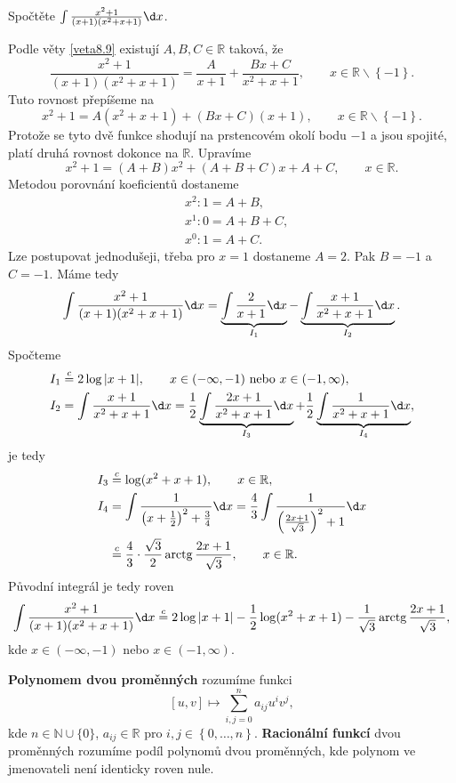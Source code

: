 \begin{priklad}
	Spočtěte $\int\frac{x^2+1}{(x+1)(x^2+x+1)}\d x$.
	\par Podle věty \ref{veta8.9} existují $A,B,C \in \mathbb R $ taková, že
	$$
	    \frac{x^2+1}{(x+1)(x^2+x+1)} = \frac{A}{x+1}+ \frac{Bx+C}{x^2+x+1}, \qquad x \in \mathbb R \smallsetminus \left \{ -1 \right \}.
	$$
	Tuto rovnost přepíšeme na
	$$
	    x^2+1 = A(x^2+x+1) + (Bx+C)(x+1), \qquad x \in \mathbb R \smallsetminus \left \{ -1 \right \}.
	$$
	Protože se tyto dvě funkce shodují na prstencovém okolí bodu $-1$ a jsou spojité,
	platí druhá rovnost dokonce na $\mathbb R $. Upravíme
	$$
	    x^2+1 = (A+B)x^2+(A+B+C)x+A+C, \qquad x \in \mathbb R.
	$$
	Metodou porovnání koeficientů dostaneme
	\begin{align*}
		&x^2: 1 = A+B,\\
		&x^1: 0=A+B+C, \\
		&x^0: 1 = A+C.
	\end{align*}
	Lze postupovat jednodušeji, třeba pro $x=1$ dostaneme $A=2$. Pak $B=-1$ a $C = -1$. Máme tedy
	$$
	    \int \frac{x^2+1}{(x+1)(x^2+x+1)}\d x = \underbrace{\int \frac{2}{x+1} \d x}_{I_1}- \underbrace{\int \frac{x+1}{x^2+x+1}\d x}_{I_2}.
	$$
	Spočteme
	\begin{align*}
	I_1 &\stackrel{c}{=} 2\log |x+1|, \qquad x \in (-\infty, -1) \text{ nebo } x \in (-1,\infty),\\
	I_2 &= \int \frac{x+1}{x^2+x+1}\d x = \frac{1}{2} \underbrace{\int \frac{2x+1}{x^2+x+1}\d x}_{I_3} + \frac{1}{2} \underbrace{\int \frac{1}{x^2+x+1}\d x }_{I_4},
\end{align*}
je tedy
\begin{align*}
I_3 &\stackrel{c}{=} \log (x^2+x+1), \qquad x \in \mathbb R, \\
I_4 &= \int \frac{1}{\left( x+\frac{1}{2} \right )^2 + \frac{3}{4} } \d x= \frac{4}{3} \int \frac{1}{\left( \frac{2x+1}{\sqrt{3}} \right )^2 +1} \d x \\
&\stackrel{c}{=} \frac{4}{3}\cdot \frac{\sqrt{3}}{2} \arctg{\frac{2x+1}{\sqrt{3}}}, \qquad x \in \mathbb R.
\end{align*}
Původní integrál je tedy roven
$$
    \int\frac{x^2+1}{(x+1)(x^2+x+1)}\d x \stackrel{c}{=} 2\log |x+1| - \frac{1}{2} \log (x^2+x+1) - \frac{1}{\sqrt{3}}\arctg \frac{2x+1}{\sqrt{3}},
$$
kde $x \in (-\infty, -1)$ nebo $x \in (-1,\infty)$.
\end{priklad}

\begin{definice}
\textbf{Polynomem dvou proměnných} rozumíme funkci
\[
[u,v] \mapsto \sum_{i,j=0}^n a_{ij} u^i v^j,
\]
kde $n \in \mathbb{N}\cup\{0\}$, $a_{ij} \in \mathbb{R}$ pro $i,j\in \left \{ 0,\dots,n \right \} $.
\textbf{Racionální funkcí} dvou proměnných rozumíme podíl polynomů dvou proměnných, kde polynom ve jmenovateli není identicky roven nule.
\end{definice}

